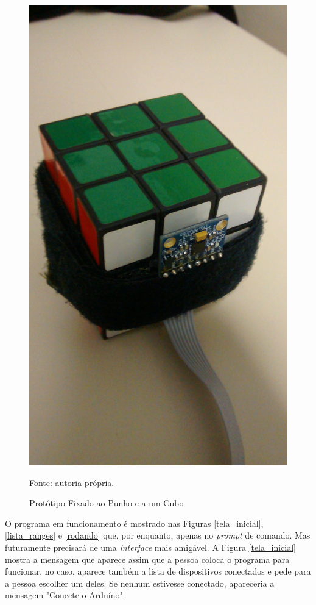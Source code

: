 \begin{figure}[h]
	 		\includegraphics[keepaspectratio=true,scale=0.1]{figuras/prototipo_2_3.jpg}
	 		\caption{Protótipo Fixado ao Punho e a um Cubo}
	 		Fonte: autoria própria. 
	 		\label{prototipo3}	
	 	\end{figure}
	 
	O programa em funcionamento é mostrado nas Figuras \ref{tela_inicial}, \ref{lista_ranges} e \ref{rodando} que, por enquanto, apenas no \textit{prompt} de comando. Mas futuramente precisará de uma \textit{interface} mais amigável. A Figura \ref{tela_inicial} mostra a mensagem que aparece assim que a pessoa coloca o programa para funcionar, no caso, aparece também a lista de dispositivos conectados e pede para a pessoa escolher um deles. Se nenhum estivesse conectado, apareceria a mensagem "Conecte o Arduíno".
	
